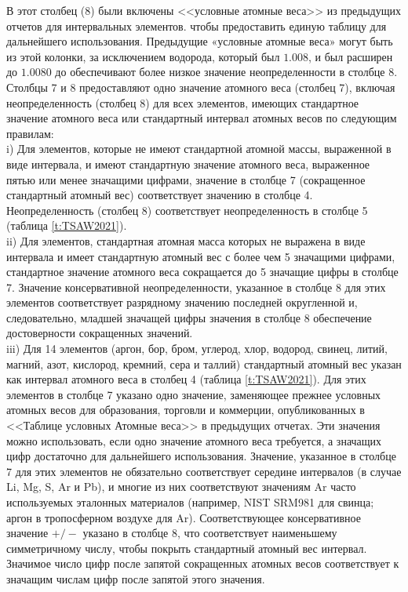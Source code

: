 \documentclass[a5paper,openany]{book}
\begin{document}
В этот столбец (8) были включены <<условные атомные веса>> из предыдущих отчетов для интервальных элементов.
чтобы предоставить единую таблицу для дальнейшего использования. Предыдущие «условные атомные веса» могут быть
из этой колонки, за исключением водорода, который был $1.008$, и был расширен до $1.0080$ до
обеспечивают более низкое значение неопределенности в столбце 8. Столбцы 7 и 8 предоставляют одно значение атомного веса
(столбец 7), включая неопределенность (столбец 8) для всех элементов, имеющих стандартное значение атомного веса или
стандартный интервал атомных весов по следующим правилам: \\
i) Для элементов, которые не имеют стандартной атомной массы, выраженной в виде интервала, и имеют стандартную
значение атомного веса, выраженное пятью или менее значащими цифрами, значение в столбце 7 (сокращенное
стандартный атомный вес) соответствует значению в столбце 4. Неопределенность (столбец 8) соответствует
неопределенность в столбце 5 (таблица \ref{t:TSAW2021}). \\
ii) Для элементов, стандартная атомная масса которых не выражена в виде интервала и имеет стандартную
атомный вес с более чем 5 значащими цифрами, стандартное значение атомного веса сокращается до 5
значащие цифры в столбце 7. Значение консервативной неопределенности, указанное в столбце 8 для этих элементов
соответствует разрядному значению последней округленной и, следовательно, младшей значащей цифры значения в столбце 8 обеспечение достоверности сокращенных значений. \\
iii) Для 14 элементов (аргон, бор, бром, углерод, хлор, водород, свинец, литий, магний, азот,
кислород, кремний, сера и таллий) стандартный атомный вес указан как интервал атомного веса в
столбец 4 (таблица \ref{t:TSAW2021}). Для этих элементов в столбце 7 указано одно значение, заменяющее прежнее
условных атомных весов для образования, торговли и коммерции, опубликованных в <<Таблице условных
Атомные веса>> в предыдущих отчетах. Эти значения можно использовать, если одно значение атомного веса
требуется, а значащих цифр достаточно для дальнейшего использования. Значение, указанное в столбце 7
для этих элементов не обязательно соответствует середине интервалов (в случае Li, Mg, S, Ar
и Pb), и многие из них соответствуют значениям Ar часто используемых эталонных материалов (например, NIST SRM981 для свинца; аргон в тропосферном воздухе для Ar). Соответствующее консервативное значение $+/-$ указано в столбце 8, что соответствует наименьшему симметричному числу, чтобы покрыть стандартный атомный вес
интервал. Значимое число цифр после запятой сокращенных атомных весов соответствует
к значащим числам цифр после запятой этого значения. 
\end{document}
